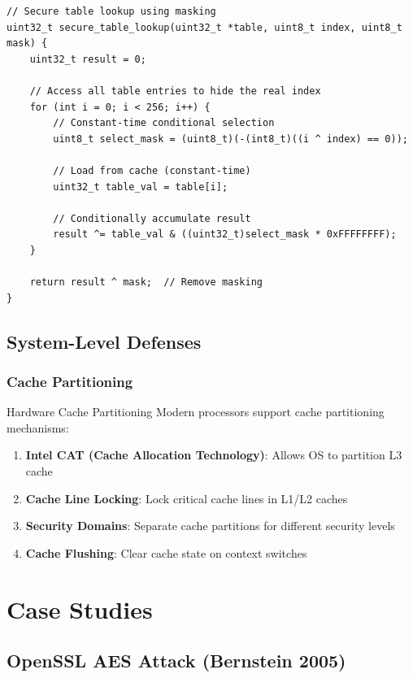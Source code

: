 \documentclass[11pt,a4paper]{article}
\theoremstyle{definition}
\begin{document}
\begin{lstlisting}[caption={Masked Table Lookups}]
// Secure table lookup using masking
uint32_t secure_table_lookup(uint32_t *table, uint8_t index, uint8_t mask) {
    uint32_t result = 0;
    
    // Access all table entries to hide the real index
    for (int i = 0; i < 256; i++) {
        // Constant-time conditional selection
        uint8_t select_mask = (uint8_t)(-(int8_t)((i ^ index) == 0));
        
        // Load from cache (constant-time)
        uint32_t table_val = table[i];
        
        // Conditionally accumulate result
        result ^= table_val & ((uint32_t)select_mask * 0xFFFFFFFF);
    }
    
    return result ^ mask;  // Remove masking
}
\end{lstlisting}

\subsection{System-Level Defenses}

\subsubsection{Cache Partitioning}

\begin{securitybox}{Hardware Cache Partitioning}
Modern processors support cache partitioning mechanisms:

\begin{enumerate}
    \item \textbf{Intel CAT (Cache Allocation Technology)}: Allows OS to partition L3 cache
    \item \textbf{Cache Line Locking}: Lock critical cache lines in L1/L2 caches  
    \item \textbf{Security Domains}: Separate cache partitions for different security levels
    \item \textbf{Cache Flushing}: Clear cache state on context switches
\end{enumerate}
\end{securitybox}

\section{Case Studies}

\subsection{OpenSSL AES Attack (Bernstein 2005)}
\end{document}
